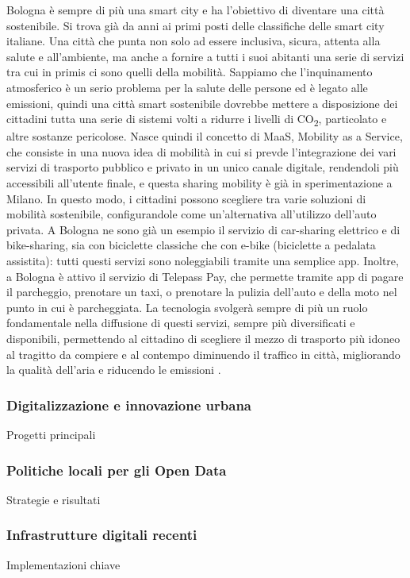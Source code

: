 Bologna è sempre di più una smart city e ha l'obiettivo di diventare una città sostenibile. Si trova già da anni ai primi posti delle classifiche delle smart city italiane. Una città che punta non solo ad essere inclusiva, sicura, attenta alla salute e all'ambiente, ma anche a fornire a tutti i suoi abitanti una serie di servizi tra cui in primis ci sono quelli della mobilità. Sappiamo che l'inquinamento atmosferico è un serio problema per la salute delle persone ed è legato alle emissioni, quindi una città smart sostenibile dovrebbe mettere a disposizione dei cittadini tutta una serie di sistemi volti a ridurre i livelli di CO\textsubscript{2}, particolato e altre sostanze pericolose. Nasce quindi il concetto di MaaS, Mobility as a Service, che consiste in una nuova idea di mobilità in cui si prevde l'integrazione dei vari servizi di trasporto pubblico e privato in un unico canale digitale, rendendoli più accessibili all'utente finale, e questa sharing mobility è già in sperimentazione a Milano. In questo modo, i cittadini possono scegliere tra varie soluzioni di mobilità sostenibile, configurandole come un'alternativa all'utilizzo dell'auto privata. A Bologna ne sono già un esempio il servizio di car-sharing elettrico e di bike-sharing, sia con biciclette classiche che con e-bike (biciclette a pedalata assistita): tutti questi servizi sono noleggiabili tramite una semplice app. Inoltre, a Bologna è attivo il servizio di Telepass Pay, che permette tramite app di pagare il parcheggio, prenotare un taxi, o prenotare la pulizia dell'auto e della moto nel punto in cui è parcheggiata. La tecnologia svolgerà sempre di più un ruolo fondamentale nella diffusione di questi servizi, sempre più diversificati e disponibili, permettendo al cittadino di scegliere il mezzo di trasporto più idoneo al tragitto da compiere e al contempo diminuendo il traffico in città, migliorando la qualità dell'aria e riducendo le emissioni \cite{Bolognatoday_Smart_City}.

\subsubsection{Digitalizzazione e innovazione urbana}
Progetti principali

\subsubsection{Politiche locali per gli Open Data}
Strategie e risultati

\subsubsection{Infrastrutture digitali recenti}
Implementazioni chiave


